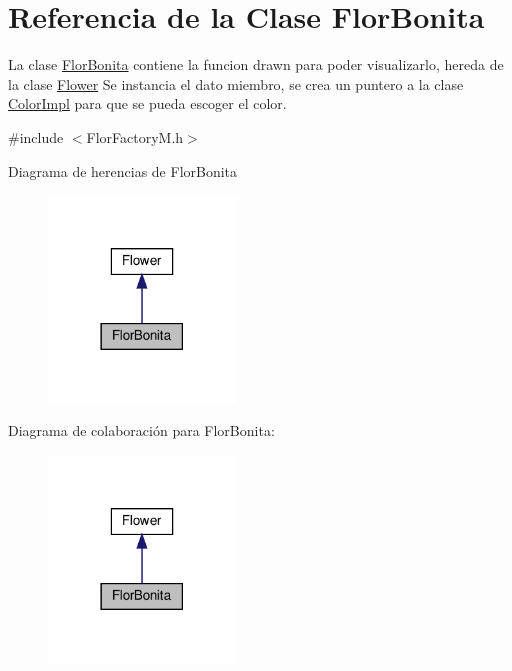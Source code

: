 \hypertarget{classFlorBonita}{}\section{Referencia de la Clase Flor\+Bonita}
\label{classFlorBonita}


La clase \hyperlink{classFlorBonita}{Flor\+Bonita} contiene la funcion drawn para poder visualizarlo, hereda de la clase \hyperlink{classFlower}{Flower}  Se instancia el dato miembro, se crea un puntero a la clase \hyperlink{classColorImpl}{Color\+Impl} para que se pueda escoger el color.  




{\ttfamily \#include $<$Flor\+Factory\+M.\+h$>$}



Diagrama de herencias de Flor\+Bonita
\nopagebreak
\begin{figure}[H]
\begin{center}
\leavevmode
\includegraphics[width=141pt]{classFlorBonita__inherit__graph}
\end{center}
\end{figure}


Diagrama de colaboración para Flor\+Bonita\+:
\nopagebreak
\begin{figure}[H]
\begin{center}
\leavevmode
\includegraphics[width=141pt]{classFlorBonita__coll__graph}
\end{center}
\end{figure}

